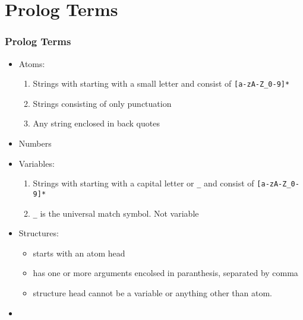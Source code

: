 \section{Prolog Terms}
\begin{frame}
\frametitle{Prolog Terms}
\begin{itemize}
\item Atoms:
	\begin{enumerate}
	\item Strings with starting with a small letter and consist of
		\lstinline![a-zA-Z_0-9]*!
	\item Strings consisting of only punctuation
	\item Any string enclosed in back quotes
	\end{enumerate}
\item Numbers
\item Variables:
	\begin{enumerate}
	\item Strings with starting with a capital letter or {\tt \_} and consist of
		\lstinline![a-zA-Z_0-9]*!
	\item {\tt \_} is the universal match symbol. Not variable
	\end{enumerate}
\end{itemize}
\end{frame}
\begin{frame}
\begin{itemize}
\item Structures:
	\begin{itemize}
	\item starts with an atom head
	\item has one or more arguments encolsed in paranthesis, separated by comma
	\item structure head cannot be a variable or anything other than atom.
	\end{itemize}
\end{itemize}
\end{frame}
\begin{frame}
\begin{itemize}
\item\ 
\end{itemize}
\end{frame}

